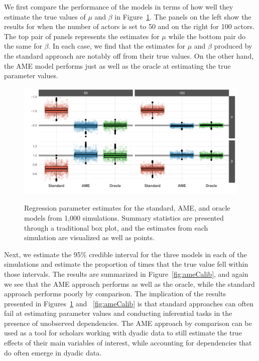 We first compare the performance of the models in terms of how well they estimate the true values of $\mu$ and $\beta$ in Figure~\ref{fig:ameBias}. The panels on the left show the results for when the number of actors is set to 50 and on the  right for 100 actors. The top pair of panels represents the estimates for $\mu$ while the bottom pair do the same for $\beta$. In each case, we find that the estimates for $\mu$ and $\beta$ produced by the standard approach are notably off from their true values. On the other hand, the AME model performs just as well as the oracle at estimating the true parameter values.

\begin{figure}
	\centering
	\caption{Regression parameter estimates for the standard, AME, and oracle models from 1,000 simulations. Summary statistics are presented through a traditional box plot, and the estimates from each simulation are visualized as well as points.}
	\label{fig:ameBias}
	\includegraphics[width=1\textwidth]{graphics/ameSimBias_all.pdf} \\
\end{figure}

Next, we estimate the 95\% credible interval for the three models in each of the simulations and estimate the proportion of times that the true value fell within those intervals. The results are summarized in Figure~\ref{fig:ameCalib}, and again we see that the AME approach performs as well as the oracle, while the standard approach performs poorly by comparison. The implication of the results presented in Figures~\ref{fig:ameBias} and ~\ref{fig:ameCalib} is that standard approaches can often fail at estimating parameter values and conducting inferential tasks in the presence of unobserved dependencies. The AME approach by comparison can be used as a tool for scholars working with dyadic data to still estimate the true effects of their main variables of interest, while accounting for dependencies that do often emerge in dyadic data.


